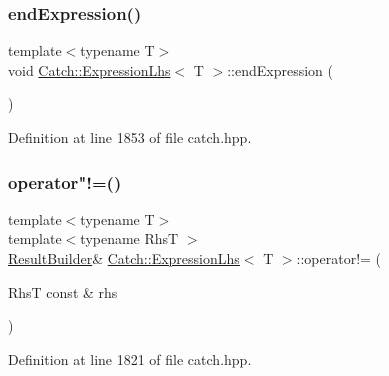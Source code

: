 \subsubsection{\texorpdfstring{end\+Expression()}{endExpression()}}
{\footnotesize\ttfamily template$<$typename T$>$ \\
void \hyperlink{class_catch_1_1_expression_lhs}{Catch\+::\+Expression\+Lhs}$<$ T $>$\+::end\+Expression (\begin{DoxyParamCaption}{ }\end{DoxyParamCaption})\hspace{0.3cm}{\ttfamily [inline]}}



Definition at line 1853 of file catch.\+hpp.

\hypertarget{class_catch_1_1_expression_lhs_a44df9974cf20fcfda4e5b6b3c01d5f93}{}\label{class_catch_1_1_expression_lhs_a44df9974cf20fcfda4e5b6b3c01d5f93} 
\subsubsection{\texorpdfstring{operator"!=()}{operator!=()}\hspace{0.1cm}{\footnotesize\ttfamily [1/2]}}
{\footnotesize\ttfamily template$<$typename T$>$ \\
template$<$typename RhsT $>$ \\
\hyperlink{class_catch_1_1_result_builder}{Result\+Builder}\& \hyperlink{class_catch_1_1_expression_lhs}{Catch\+::\+Expression\+Lhs}$<$ T $>$\+::operator!= (\begin{DoxyParamCaption}\item[{RhsT const \&}]{rhs }\end{DoxyParamCaption})\hspace{0.3cm}{\ttfamily [inline]}}



Definition at line 1821 of file catch.\+hpp.

\hypertarget{class_catch_1_1_expression_lhs_a71e48da9a894962e8b32a8af5359a4df}{}\label{class_catch_1_1_expression_lhs_a71e48da9a894962e8b32a8af5359a4df} 
